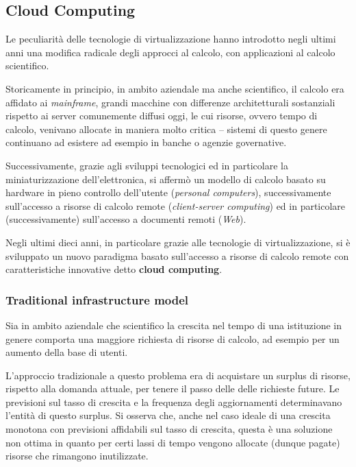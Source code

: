 \documentclass[italian,]{article}
\begin{document}
\subsection{Cloud Computing}\label{cloud-computing}

Le peculiarità delle tecnologie di virtualizzazione hanno introdotto
negli ultimi anni una modifica radicale degli approcci al calcolo, con
applicazioni al calcolo scientifico.

Storicamente in principio, in ambito aziendale ma anche scientifico, il
calcolo era affidato ai \emph{mainframe}, grandi macchine con differenze
architetturali sostanziali rispetto ai server comunemente diffusi oggi,
le cui risorse, ovvero tempo di calcolo, venivano allocate in maniera
molto critica -- sistemi di questo genere continuano ad esistere ad
esempio in banche o agenzie governative.

Successivamente, grazie agli sviluppi tecnologici ed in particolare la
miniaturizzazione dell'elettronica, si affermò un modello di calcolo
basato su hardware in pieno controllo dell'utente (\emph{personal
computers}), successivamente sull'accesso a risorse di calcolo remote
(\emph{client-server computing}) ed in particolare (successivamente)
sull'accesso a documenti remoti (\emph{Web}).

Negli ultimi dieci anni, in particolare grazie alle tecnologie di
virtualizzazione, si è sviluppato un nuovo paradigma basato sull'accesso
a risorse di calcolo remote con caratteristiche innovative detto
\textbf{cloud computing}.

\subsubsection{Traditional infrastructure
model}\label{traditional-infrastructure-model}

Sia in ambito aziendale che scientifico la crescita nel tempo di una
istituzione in genere comporta una maggiore richiesta di risorse di
calcolo, ad esempio per un aumento della base di utenti.

L'approccio tradizionale a questo problema era di acquistare un surplus
di risorse, rispetto alla domanda attuale, per tenere il passo delle
delle richieste future. Le previsioni sul tasso di crescita e la
frequenza degli aggiornamenti determinavano l'entità di questo surplus.
Si osserva che, anche nel caso ideale di una crescita monotona con
previsioni affidabili sul tasso di crescita, questa è una soluzione non
ottima in quanto per certi lassi di tempo vengono allocate (dunque
pagate) risorse che rimangono inutilizzate.
\end{document}
